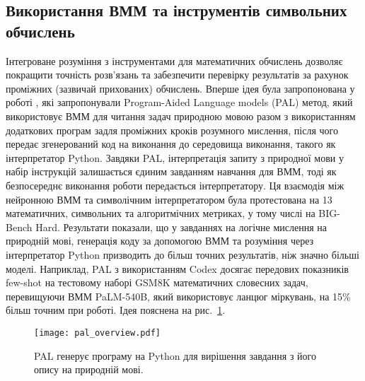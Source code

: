 \subsection{Використання ВММ та інструментів символьних обчислень}
Інтегроване розуміння з інструментами для математичних обчислень дозволяє покращити точність розв'язань та забезпечити перевірку результатів за рахунок проміжних (зазвичай прихованих) обчислень. Вперше ідея була запропонована у роботі \cite{gao2023palprogramaidedlanguagemodels}, які запропонували Program-Aided Language models (PAL) метод, який використовує ВММ для читання задач природною мовою разом з використанням додаткових програм задля проміжних кроків розумного мислення, після чого передає згенерований код на виконання до середовища виконання, такого як інтерпретатор Python. Завдяки PAL, інтерпретація запиту з природної мови у набір інструкцій залишається єдиним завданням навчання для ВММ, тоді як безпосереднє виконання роботи передається інтерпретатору. Ця взаємодія між нейронною ВММ та символічним інтерпретатором була протестована на 13 математичних, символьних та алгоритмічних метриках, у тому числі на BIG-Bench Hard. Результати показали, що у завданнях на логічне мислення на природній мові, генерація коду за допомогою ВММ та розуміння через інтерпретатор Python призводить до більш точних результатів, ніж значно більші моделі. Наприклад, PAL з використанням Codex досягає передових показників few-shot на тестовому наборі GSM8K математичних словесних задач, перевищуючи ВММ PaLM-540B, який використовує ланцюг міркувань, на 15\% більш точним при роботі. Ідея пояснена на рис.~\ref{fig:pal-overview}.

\begin{figure}[!h]
    \centering
    \texttt{[image: pal\_overview.pdf]}
    \caption{PAL генерує програму на Python для вирішення завдання з його опису на природній мові.}
    \label{fig:pal-overview}
\end{figure}

